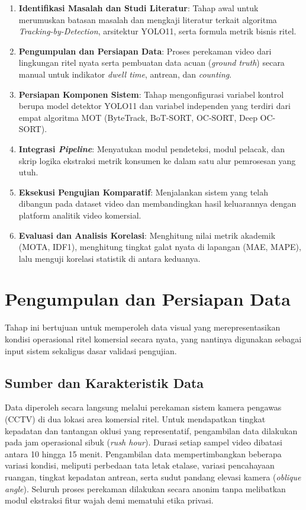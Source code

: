 \begin{enumerate}
    \item \textbf{Identifikasi Masalah dan Studi Literatur}: Tahap awal untuk merumuskan batasan masalah dan mengkaji literatur terkait algoritma \textit{Tracking-by-Detection}, arsitektur YOLO11, serta formula metrik bisnis ritel.
    \item \textbf{Pengumpulan dan Persiapan Data}: Proses perekaman video dari lingkungan ritel nyata serta pembuatan data acuan (\textit{ground truth}) secara manual untuk indikator \textit{dwell time}, antrean, dan \textit{counting}.
    \item \textbf{Persiapan Komponen Sistem}: Tahap mengonfigurasi variabel kontrol berupa model detektor YOLO11 dan variabel independen yang terdiri dari empat algoritma MOT (ByteTrack, BoT-SORT, OC-SORT, Deep OC-SORT).
    \item \textbf{Integrasi \textit{Pipeline}}: Menyatukan modul pendeteksi, modul pelacak, dan skrip logika ekstraksi metrik konsumen ke dalam satu alur pemrosesan yang utuh.
    \item \textbf{Eksekusi Pengujian Komparatif}: Menjalankan sistem yang telah dibangun pada dataset video dan membandingkan hasil keluarannya dengan platform analitik video komersial.
    \item \textbf{Evaluasi dan Analisis Korelasi}: Menghitung nilai metrik akademik (MOTA, IDF1), menghitung tingkat galat nyata di lapangan (MAE, MAPE), lalu menguji korelasi statistik di antara keduanya.
\end{enumerate}

\section{Pengumpulan dan Persiapan Data}

Tahap ini bertujuan untuk memperoleh data visual yang merepresentasikan kondisi operasional ritel komersial secara nyata, yang nantinya digunakan sebagai input sistem sekaligus dasar validasi pengujian.

\subsection{Sumber dan Karakteristik Data}
Data diperoleh secara langsung melalui perekaman sistem kamera pengawas (CCTV) di dua lokasi area komersial ritel. Untuk mendapatkan tingkat kepadatan dan tantangan oklusi yang representatif, pengambilan data dilakukan pada jam operasional sibuk (\textit{rush hour}). Durasi setiap sampel video dibatasi antara 10 hingga 15 menit. Pengambilan data mempertimbangkan beberapa variasi kondisi, meliputi perbedaan tata letak etalase, variasi pencahayaan ruangan, tingkat kepadatan antrean, serta sudut pandang elevasi kamera (\textit{oblique angle}). Seluruh proses perekaman dilakukan secara anonim tanpa melibatkan modul ekstraksi fitur wajah demi mematuhi etika privasi.

